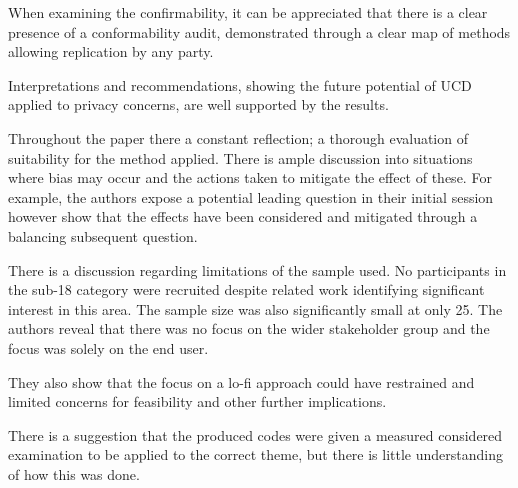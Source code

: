 
When examining the confirmability, it can be appreciated that there is a clear presence of a conformability audit, demonstrated through a clear map of methods allowing replication by any party.  

Interpretations and recommendations, showing the future potential of UCD applied to privacy concerns, are well supported by the results.  

Throughout the paper there a constant reflection; a thorough evaluation of suitability for the method applied. There is ample discussion into situations where bias may occur and the actions taken to mitigate the effect of these. For example, the authors expose a potential leading question in their initial session however show that the effects have been considered and mitigated through a balancing subsequent question. 

There is a discussion regarding limitations of the sample used. No participants in the sub-18 category were recruited despite related work identifying significant interest in this area. The sample size was also significantly small at only 25. The authors reveal that there was no focus on the wider stakeholder group and the focus was solely on the end user. 

They also show that the focus on a lo-fi approach could have restrained and limited concerns for feasibility and other further implications.

There is a suggestion that the produced codes were given a measured considered examination to be applied to the correct theme, but there is little understanding of how this was done.

\newpage